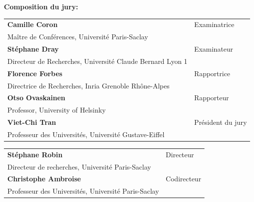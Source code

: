 \begin{titlepage}
\vspace{\fill} %

\flushleft \small \textbf{Composition du jury:}
\bigskip



\scriptsize
\begin{tabular}{|p{8cm}l}
\arrayrulecolor{Prune}
\textbf{Camille Coron} &  Examinatrice \\ 
Maître de Conférences, Université Paris-Saclay   &   \\ 
\textbf{Stéphane Dray} &  Examinateur \\ 
Directeur de Recherches, Université Claude Bernard Lyon 1 &   \\ 
\textbf{Florence Forbes} &  Rapportrice \\ 
Directrice de Recherches, Inria Grenoble Rhône-Alpes  &   \\ 
\textbf{Otso Ovaskainen} &  Rapporteur \\ 
Professor, University of Helsinky  &   \\ 
\textbf{Viet-Chi Tran} &   Président du jury\\ 
Professeur des Universités, Université Gustave-Eiffel & \\
\end{tabular} 

\medskip
\begin{tabular}{|p{8cm}l}\arrayrulecolor{white}
\textbf{Stéphane Robin} &   Directeur\\ 
Directeur de recherches, Université Paris-Saclay & \\
\textbf{Christophe Ambroise} &   Codirecteur\\ 
Professeur des Universités, Université Paris-Saclay  &   \\ 


\end{tabular} 


\end{titlepage}
